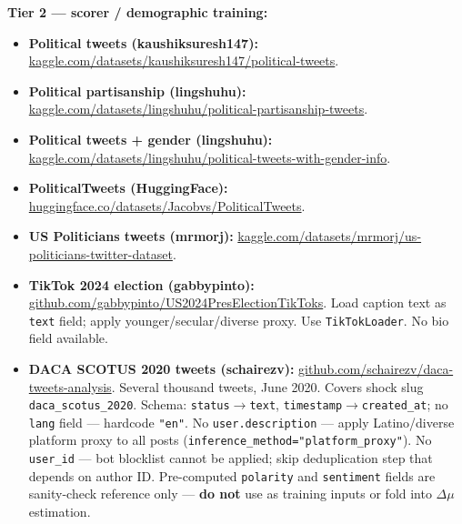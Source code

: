 \documentclass[11pt]{article}
\begin{document}
\begin{taskbox}
{  \smallskip
  \textbf{Tier 2 --- scorer / demographic training:}
  \begin{itemize}[leftmargin=1.6em, itemsep=1pt]
    \item \textbf{Political tweets (kaushiksuresh147):}
          \url{kaggle.com/datasets/kaushiksuresh147/political-tweets}.
    \item \textbf{Political partisanship (lingshuhu):}
          \url{kaggle.com/datasets/lingshuhu/political-partisanship-tweets}.
    \item \textbf{Political tweets + gender (lingshuhu):}
          \url{kaggle.com/datasets/lingshuhu/political-tweets-with-gender-info}.
    \item \textbf{PoliticalTweets (HuggingFace):}
          \url{huggingface.co/datasets/Jacobvs/PoliticalTweets}.
    \item \textbf{US Politicians tweets (mrmorj):}
          \url{kaggle.com/datasets/mrmorj/us-politicians-twitter-dataset}.
    \item \textbf{TikTok 2024 election (gabbypinto):}
          \url{github.com/gabbypinto/US2024PresElectionTikToks}.
          Load caption text as \texttt{text} field; apply younger/secular/diverse
          proxy. Use \texttt{TikTokLoader}. No bio field available.
    \item \textbf{DACA SCOTUS 2020 tweets (schairezv):}
          \url{github.com/schairezv/daca-tweets-analysis}.
          Several thousand tweets, June 2020. Covers shock slug
          \texttt{daca\_scotus\_2020}. Schema:
          \texttt{status}$\to$\texttt{text},
          \texttt{timestamp}$\to$\texttt{created\_at};
          no \texttt{lang} field --- hardcode \texttt{"en"}.
          No \texttt{user.description} --- apply Latino/diverse platform proxy
          to all posts (\texttt{inference\_method="platform\_proxy"}).
          No \texttt{user\_id} --- bot blocklist cannot be applied; skip
          deduplication step that depends on author ID.
          Pre-computed \texttt{polarity} and \texttt{sentiment} fields are
          sanity-check reference only --- \textbf{do not} use as training
          inputs or fold into $\Delta\mu$ estimation.
  \end{itemize}

}
\end{taskbox}
\end{document}
